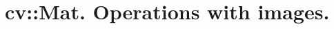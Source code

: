 
\chapter{cv::Mat. Operations with images.}
\renewcommand{\curModule}{cv::Mat. Operations with images.}


